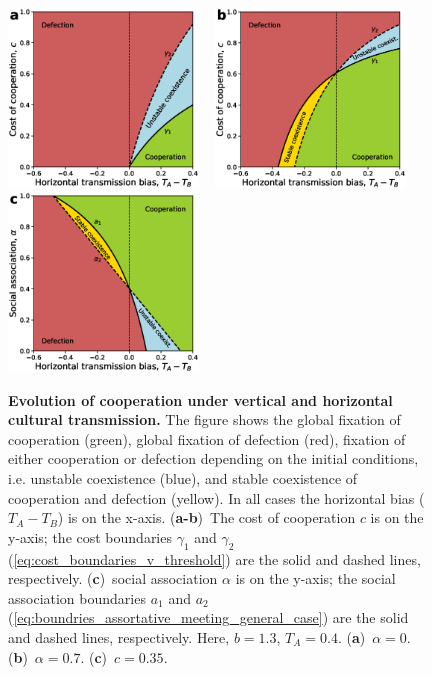\documentclass[12pt]{extarticle}
\begin{document}
\begin{figure}[p]
  \centering       
    \includegraphics[width=0.45\textwidth]{Result2_c_zero_alpha.eps}
	~
    \includegraphics[width=0.45\textwidth]{Result2_c_non_zero_alpha.eps}
    ~
    \includegraphics[width=0.45\textwidth]{Result2_alpha.eps}

    \caption{\textbf{Evolution of cooperation under vertical and horizontal cultural transmission.} 
The figure shows the global fixation of cooperation (green), global fixation of defection (red), fixation of either cooperation or defection depending on the initial conditions, i.e. unstable coexistence (blue), and stable coexistence of cooperation and defection (yellow).
In all cases the horizontal bias ($T_A-T_B$) is on the x-axis.
(\textbf{a-b})~The cost of cooperation $c$ is on the y-axis; the cost boundaries $\gamma_1$ and $\gamma_2$ (\autoref{eq:cost_boundaries_v_threshold}) are the solid and dashed lines, respectively. 
(\textbf{c})~social association $\alpha$ is on the y-axis; the social association boundaries $a_1$ and $a_2$ (\autoref{eq:boundries_assortative_meeting_general_case}) are the solid and dashed lines, respectively.
Here, $b=1.3$, $T_A=0.4$. (\textbf{a})~$\alpha = 0$.(\textbf{b})~$\alpha = 0.7$. (\textbf{c})~$c = 0.35$.
  	}
    \label{fig:result2}
\end{figure}
\end{document}
